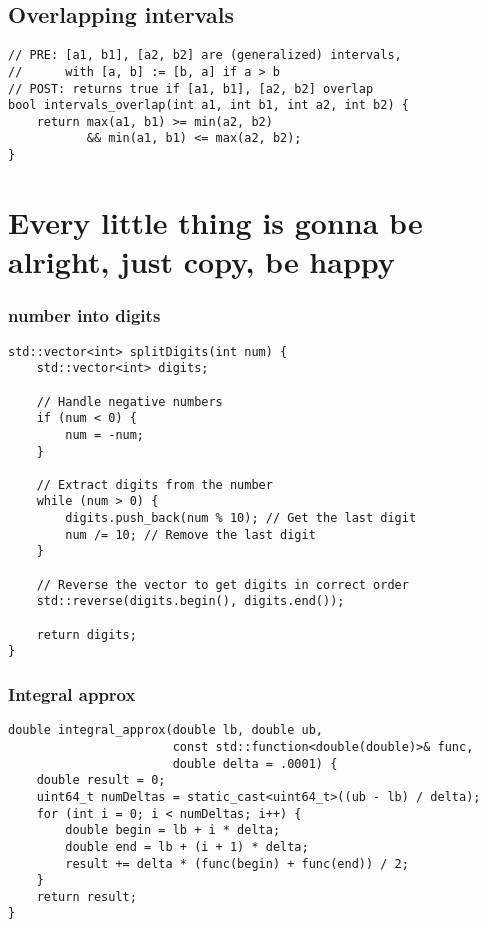 \subsection{Overlapping intervals}

\begin{lstlisting}[style = codeexpert]
// PRE: [a1, b1], [a2, b2] are (generalized) intervals,
//      with [a, b] := [b, a] if a > b
// POST: returns true if [a1, b1], [a2, b2] overlap
bool intervals_overlap(int a1, int b1, int a2, int b2) {
    return max(a1, b1) >= min(a2, b2) 
           && min(a1, b1) <= max(a2, b2);
}
\end{lstlisting}


\section{Every little thing is gonna be alright, just copy, be happy}

\subsubsection{number into digits}
\begin{lstlisting}[style = codeexpert]
std::vector<int> splitDigits(int num) {
    std::vector<int> digits;
    
    // Handle negative numbers
    if (num < 0) {
        num = -num;
    }

    // Extract digits from the number
    while (num > 0) {
        digits.push_back(num % 10); // Get the last digit
        num /= 10; // Remove the last digit
    }

    // Reverse the vector to get digits in correct order
    std::reverse(digits.begin(), digits.end());

    return digits;
}

\end{lstlisting}


\subsubsection{Integral approx}
\begin{lstlisting}[style = codeexpert]
double integral_approx(double lb, double ub,
                       const std::function<double(double)>& func,
                       double delta = .0001) {
    double result = 0;
    uint64_t numDeltas = static_cast<uint64_t>((ub - lb) / delta);
    for (int i = 0; i < numDeltas; i++) {
        double begin = lb + i * delta;
        double end = lb + (i + 1) * delta;
        result += delta * (func(begin) + func(end)) / 2;
    }
    return result;
}


\end{lstlisting}


